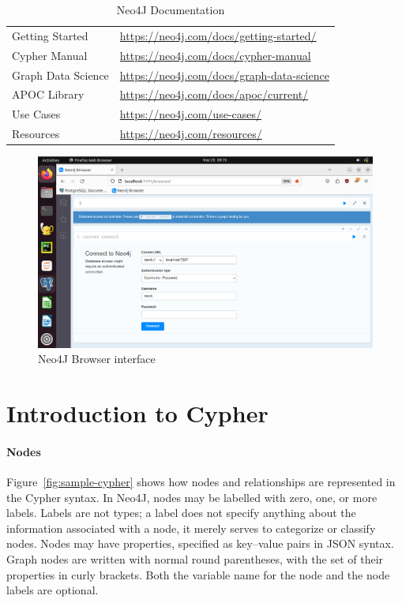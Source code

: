 \begin{table}
\renewcommand{\arraystretch}{1.5}
\centering
\small
\begin{tabular}{l|l} \hline
Getting Started & \url{https://neo4j.com/docs/getting-started/} \\ 
Cypher Manual & \url{https://neo4j.com/docs/cypher-manual} \\
Graph Data Science & \url{https://neo4j.com/docs/graph-data-science} \\ 
APOC Library & \url{https://neo4j.com/docs/apoc/current/} \\ 
Use Cases & \url{https://neo4j.com/use-cases/} \\
Resources & \url{https://neo4j.com/resources/} \\
\hline
\end{tabular}
\caption{Neo4J Documentation}
\label{tab:neo4jinfo}
\end{table}

\begin{figure}
\centering
\includegraphics[width=.75\textwidth]{screen1.png}
\caption{Neo4J Browser interface}
\label{fig:neo4jbrowser}
\end{figure}

\section{Introduction to Cypher}

\paragraph*{Nodes}
Figure~\ref{fig:sample-cypher} shows how nodes and relationships are represented in the Cypher syntax. In Neo4J, nodes may be labelled with zero, one, or more labels. Labels are not types; a label does not specify anything about the information associated with a node, it merely serves to categorize or classify nodes. Nodes may have properties, specified as key--value pairs in JSON syntax. Graph nodes are written with normal round parentheses, with the set of their properties in curly brackets. Both the variable name for the node and the node labels are optional.

